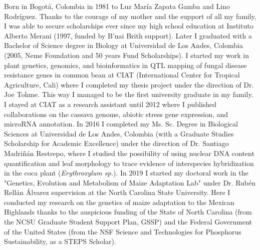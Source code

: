 \begin{biography}
Born in Bogotá, Colombia in 1981 to Luz María Zapata Gamba and Lino Rodríguez.
Thanks to the courage of my mother and the support of all my family, I was able to secure scholarships ever since my high school education at Instituto Alberto Merani (1997, funded by B'nai Brith support). 
Later I graduated with a Bachelor of Science degree in Biology at Universidad de Los Andes, Colombia (2005, Neme Foundation and 50 years Fund Scholarships).
I started my work in plant genetics, genomics, and bioinformatics in QTL mapping of fungal disease resistance genes in common bean at CIAT (International Center for Tropical Agriculture, Cali) where I completed my thesis project under the direction of Dr. Joe Tohme.
This way I managed to be the first university graduate in my family.
I stayed at CIAT as a research assistant until 2012 where I published collaborations on the cassava genome, abiotic stress gene expression, and microRNA annotation.
In 2016 I completed my Ms. Sc. Degree in Biological Sciences at Universidad de Los Andes, Colombia (with a Graduate Studies Scholarship for Academic Excellence) under the direction of Dr. Santiago Madriñán Restrepo, where I studied the possibility of using nuclear DNA content quantification and leaf morphology to trace evidence of interspecies hybridization in the coca plant (\textit{Erythroxylum sp.}).
In 2019 I started my doctoral work in the "Genetics, Evolution and Metabolism of Maize Adaptation Lab" under Dr. Rubén Rellán Álvarez supervision at the North Carolina State University. 
Here I conducted my research on the genetics of maize adaptation to the Mexican Highlands thanks to the auspicious funding of the State of North Carolina (from the NCSU Graduate Student Support Plan, GSSP) and the Federal Government of the United States (from the NSF Science and Technologies for Phosphorus Sustainability, as a STEPS Scholar).
\end{biography}

